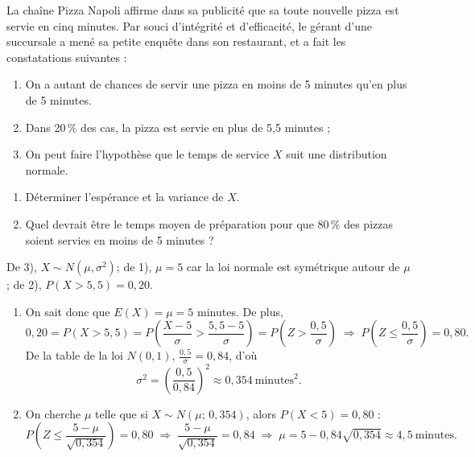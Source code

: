 \begin{exercice}
La chaîne Pizza Napoli affirme dans sa publicité que sa toute nouvelle pizza est servie en
cinq minutes. Par souci d'intégrité et d'efficacité, le gérant d'une succursale a mené sa
petite enquête dans son restaurant, et a fait les constatations suivantes :
\begin{enumerate}[label=\arabic*)]
  \item On a autant de chances de servir une pizza en moins de 5 minutes qu'en plus de 5
  minutes.
  \item Dans 20\,\% des cas, la pizza est servie en plus de 5,5 minutes ;
  \item On peut faire l'hypothèse que le temps de service $X$ suit une distribution normale.
\end{enumerate}
\begin{enumerate}[label=(\alph*)]
  \item Déterminer l'espérance et la variance de $X$.
  \item Quel devrait être le temps moyen de préparation pour que 80\,\% des pizzas soient
  servies en moins de 5 minutes ?
\end{enumerate}
\begin{solution}
De 3), $X\sim N(\mu,\sigma^2)$; de 1), $\mu=5$ car la loi normale est symétrique autour de
$\mu$; de 2), $P(X>5,5)=0,20$.
\begin{enumerate}[label=(\alph*)]
  \item On sait donc que $E(X)=\mu=5$ minutes. De plus,
  \[
    0,20=P(X>5,5)=P\!\left(\frac{X-5}{\sigma}>\frac{5,5-5}{\sigma}\right)
    =P\!\left(Z>\frac{0,5}{\sigma}\right)
    \;\Longrightarrow\;P\!\left(Z\le\frac{0,5}{\sigma}\right)=0,80.
  \]
  De la table de la loi $N(0,1)$, $\frac{0,5}{\sigma}=0,84$, d'où
  \[
    \sigma^2=\left(\frac{0,5}{0,84}\right)^{\!2}\approx 0,354\ \text{minutes}^2.
  \]
  \item On cherche $\mu$ telle que si $X\sim N(\mu;\,0,354)$, alors $P(X<5)=0,80$ :
  \[
    P\!\left(Z\le\frac{5-\mu}{\sqrt{0,354}}\right)=0,80
    \;\Longrightarrow\;\frac{5-\mu}{\sqrt{0,354}}=0,84
    \;\Longrightarrow\;\mu=5-0,84\sqrt{0,354}\approx 4,5\ \text{minutes}.
  \]
\end{enumerate}
\end{solution}
\end{exercice}


